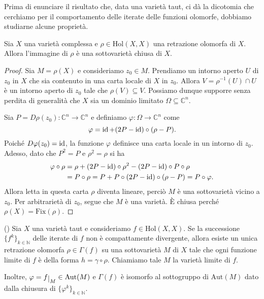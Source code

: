 Prima di enunciare il risultato che, data una varietà taut, ci dà la dicotomia che cerchiamo per il comportamento delle iterate delle funzioni olomorfe, dobbiamo studiarne alcune proprietà.

\begin{lm}
    Sia $X$ una varietà complessa e $\rho\in\text{Hol}(X,X)$ una retrazione olomorfa di $X$. Allora l'immagine di $\rho$ è una sottovarietà chiusa di $X$.
\end{lm}
\begin{proof}
    Sia $M=\rho(X)$ e consideriamo $z_0 \in M$. Prendiamo un intorno aperto $U$ di $z_0$ in $X$ che sia contenuto in una carta locale di $X$ in $z_0$. Allora $V=\rho^{-1}(U)\cap U$ è un intorno aperto di $z_0$ tale che $\rho(V) \subseteq V$. Possiamo dunque supporre senza perdita di generalità che $X$ sia un dominio limitato $\Omega\subseteq\mathbb{C}^n$.

    Sia $P=D\rho(z_0):\mathbb{C}^n \longrightarrow \mathbb{C}^n$ e definiamo $\varphi:\Omega \longrightarrow \mathbb{C}^n$ come
    $$\varphi=\operatorname{id}+(2P-\operatorname{id})\circ(\rho-P).$$
    Poiché $D\varphi(z_0)=\operatorname{id}$, la funzione $\varphi$ definisce una carta locale in un intorno di $z_0$. Adesso, dato che $P^2=P$ e $\rho^2=\rho$ si ha
    \begin{align*}
        \varphi\circ\rho&=\rho+(2P-\operatorname{id})\circ\rho^2-(2P-\operatorname{id})\circ P\circ\rho\\
        &=P\circ\rho=P+P\circ(2P-\operatorname{id})\circ(\rho-P)=P\circ\varphi.
    \end{align*}
    Allora letta in questa carta $\rho$ diventa lineare, perciò $M$ è una sottovarietà vicino a $z_0$. Per arbitrarietà di $z_0$, segue che $M$ è una varietà. È chiusa perché $\rho(X)=\text{Fix}(\rho)$.
\end{proof}

\begin{thm} \label{retraiii}
    (\cite[Theorem 2.1.5]{A4}) Sia $X$ una varietà taut e consideriamo $f\in\text{Hol}(X,X)$. Se la successione $\{f^k\}_{k\in\mathbb{N}}$ delle iterate di $f$ non è compattamente divergente, allora esiste un unica retrazione olomorfa $\rho\in\Gamma(f)$ su una sottovarietà $M$ di $X$ tale che ogni funzione limite di $f$ è della forma $h=\gamma\circ\rho$. Chiamiamo tale $M$ la \textnormal{varietà limite} di $f$.

    Inoltre, $\varphi=f\restrict{M}\in\text{Aut}(M)$ e $\Gamma(f)$ è isomorfo al sottogruppo di $\text{Aut}(M)$ dato dalla chiusura di $\{\varphi^k\}_{k \in\mathbb{N}}$.
\end{thm}

